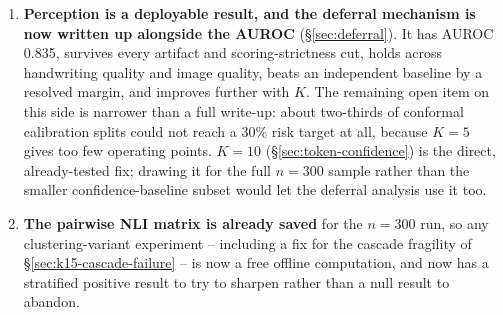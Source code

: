 \documentclass[11pt]{article}
\begin{document}
\begin{enumerate}
    it was formed from exactly the cases this check happened to cover.
  \item \textbf{Perception is a deployable result, and the deferral mechanism
    is now written up alongside the AUROC} (\S\ref{sec:deferral}). It has
    AUROC 0.835, survives every artifact and scoring-strictness cut, holds
    across handwriting quality and image quality, beats an independent
    baseline by a resolved margin, and improves further with $K$. The
    remaining open item on this side is narrower than a full write-up: about
    two-thirds of conformal calibration splits could not reach a 30\% risk
    target at all, because $K=5$ gives too few operating points. $K=10$
    (\S\ref{sec:token-confidence}) is the direct, already-tested fix; drawing
    it for the full $n=300$ sample rather than the smaller confidence-baseline
    subset would let the deferral analysis use it too.
  \item \textbf{The pairwise NLI matrix is already saved} for the $n=300$ run,
    so any clustering-variant experiment -- including a fix for the cascade
    fragility of \S\ref{sec:k15-cascade-failure} -- is now a free offline
    computation, and now has a stratified positive result to try to sharpen
    rather than a null result to abandon.
\end{enumerate}
\end{document}

